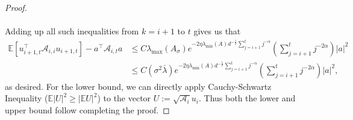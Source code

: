 \documentclass[11pt, reqno,english]{amsart}
\begin{document}
\begin{proof}
\\\\
Adding up all such inequalities from $k = i+1$ to $t$ gives us that
\begin{align*}
\mathbb{E}[u_{i+1,t}^\top \mathcal A_{i,i} u_{i+1,t}] - a^\top \mathcal A_{i,t} a &\leq C\lambda_{\max}(A_{\sigma}) e^{-2\eta \lambda_{\min}(A)d^{-\frac{1}{2}}\sum_{j = i+1}^tj^{-\alpha}}(\sum_{j = i+1}^tj^{-2\alpha}) |a|^2
\\
&\leq C(\sigma^2 \bar{\lambda})e^{-2\eta \lambda_{\min}(A)d^{-\frac{1}{2}}\sum_{j = i+1}^t j^{-\alpha}}(\sum_{j = i+1}^t j^{-2\alpha})|a|^2,
\end{align*}
as desired. For the lower bound, we can directly apply Cauchy-Schwartz Inequality ($\mathbb{E}|U|^2 \geq |\mathbb{E}U|^2$) to the vector $U := \sqrt{\mathcal A_i}u_i$. Thus both the lower and upper bound follow completing the proof.
\end{proof}
\end{document}

